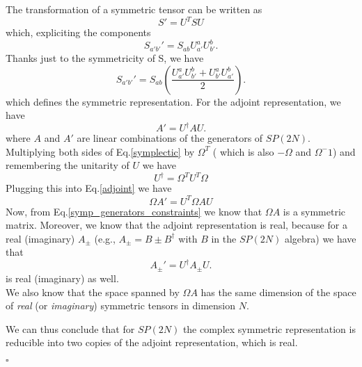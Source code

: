 \documentclass[a4paper,10pt]{article}
\newcommand*{\QEDB}{\null\nobreak\hfill\ensuremath{\square}}
\begin{document}
The transformation of a symmetric tensor can be written as
\begin{equation}
    S' = U^T S U
\end{equation}
which, expliciting the components 
\begin{equation}
    S_{a'b'}' = S_{ab} U^{a}_{a'}  U^{b}_{b'}  .
\end{equation}
Thanks just to the symmetricity of S, we have 
\begin{equation}
    S_{a'b'}' = S_{ab} \left( \frac{U^{a}_{a'}  U^{b}_{b'} + U^{a}_{b'}  U^{b}_{a'} } {2}\right) .
\end{equation}
which defines the symmetric representation.
For the adjoint representation, we have 
\begin{equation}
    A' = U^\dagger A U .
    \label{adjoint}
\end{equation}
where $A$ and $A'$ are linear combinations of the generators of $SP(2N)$.
Multiplying both sides of Eq.\ref{symplectic} by $\Omega^T$ ( which is also
$-\Omega$ and $\Omega^-1$) and remembering the unitarity of $U$ we have 
\begin{equation}
    U^\dagger = \Omega^T U^T \Omega
\end{equation}
Plugging this into Eq.\ref{adjoint} we have 
\begin{equation}
    \Omega A' = U^T \Omega A U
\end{equation}
Now, from Eq.\ref{symp_generators_constraints} we know that $\Omega A$ is a 
symmetric matrix.
Moreover, we know that the adjoint representation is real, because for a real
(imaginary)
$A_\pm$ (e.g., $A_\pm = B \pm B^\dagger$ with $B$ in the $SP(2N)$ algebra) we have 
that 
\begin{equation}
    A_\pm' = U^\dagger A_\pm U .
\end{equation}
is real (imaginary) as well.  \\
We also know that the space spanned by $\Omega A$ has the 
same dimension of the space of \emph{real} (or \emph{imaginary}) symmetric 
tensors in dimension $N$. 

We can thus conclude that for $SP(2N)$ the complex symmetric representation is
reducible into two copies of the adjoint representation, which is real.

\QEDB
\end{document}
